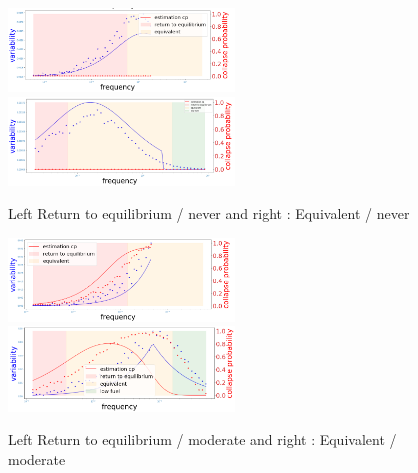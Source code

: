\documentclass{article}
\begin{document}

\begin{figure}[h!]
\begin{center}
\includegraphics[width=6cm]{results/return_never_2.png}
\includegraphics[width=6cm]{results/equivalent_never.png} \\
\end{center}
\caption{\label{fig:temp}Left Return to equilibrium / never and right : Equivalent / never} %
\end{figure}


\begin{figure}[h!]
\begin{center}
\includegraphics[width=6cm]{results/return_moderate_2.png}
\includegraphics[width=6cm]{results/equivalent_moderate_2.png} \\
\end{center}
\caption{\label{fig:temp}Left Return to equilibrium / moderate and right : Equivalent / moderate}\end{figure}
\end{document}

